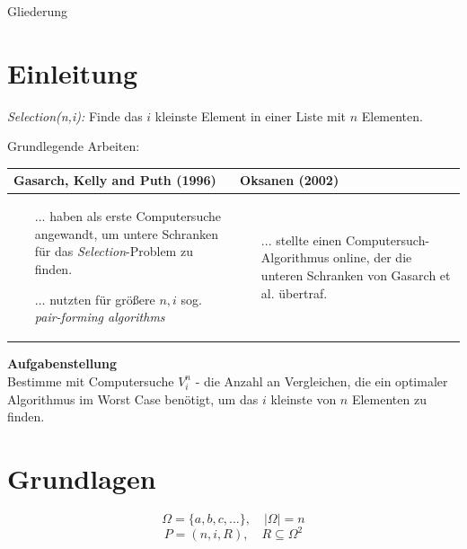 
\begin{frame}{Gliederung}
  \tableofcontents[hideallsubsections]
\end{frame}


\section{Einleitung}
\begin{frame}{\insertsection}
  \textit{Selection(n,i):} Finde das $i$ kleinste Element in einer Liste mit $n$ Elementen.

  \vspace{5mm}
  Grundlegende Arbeiten:

  \vspace{2mm}
  \begin{tabular}{|p{6cm}|p{6cm}|}
    \hline
    Gasarch, Kelly and Puth (1996) & Oksanen (2002)   \\
    \hline
    \raggedright \begin{itemize}
                   \item [...]haben als erste Computersuche angewandt, um untere Schranken für das \textit{Selection}-Problem zu finden.
                   \item [...]nutzten für größere $n,i$ sog. \textit{pair-forming algorithms}
                 \end{itemize} &
     \begin{itemize}
                   \item[...] stellte einen Computersuch-Algorithmus online, der die unteren Schranken von Gasarch et al. übertraf.
                 \end{itemize}
                  
          
  \end{tabular}
\end{frame}

\begin{frame}{\insertsection}
  \textbf{Aufgabenstellung} \\ 
  \vspace{5mm}
  Bestimme mit Computersuche $V_i^n$ - die Anzahl an Vergleichen, die ein optimaler Algorithmus im Worst Case benötigt, um das $i$ kleinste von $n$ Elementen zu finden.

\end{frame}


\section{Grundlagen}
\sectionframe{\insertsection}
\begin{frame}{\insertsection}
  $$ \Omega = \{ a,b,c,...\}, \quad |\Omega| = n $$
  $$P = (n,i,R), \quad R \subseteq \Omega^2$$
\end{frame}

